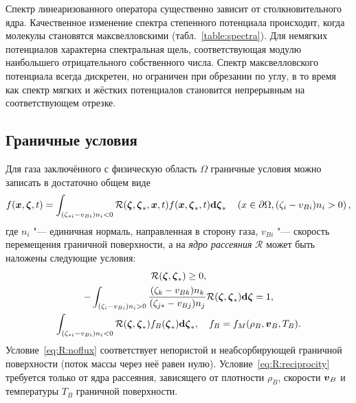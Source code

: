 Спектр линеаризованного оператора существенно зависит от столкновительного ядра.
Качественное изменение спектра степенного потенциала происходит, когда молекулы становятся максвелловскими (табл.~\ref{table:spectra}).
Для немягких потенциалов характерна спектральная щель, соответствующая модулю наибольшего отрицательного собственного числа.
Спектр максвелловского потенциала всегда дискретен, но ограничен при обрезании по углу,
в то время как спектр мягких и жёстких потенциалов становится непрерывным на соответствующем отрезке.

\subsection{Граничные условия}

Для газа заключённого с физическую область \(\Omega\) граничные условия можно записать в достаточно общем виде
\begin{equation}\label{eq:scatterring_kernel}
    f({\boldsymbol{x}},{\boldsymbol{\zeta}},t) = \int_{(\zeta_{*i}-v_{Bi})n_i<0} \mathcal{R}({\boldsymbol{\zeta}},{\boldsymbol{\zeta}}_*,{\boldsymbol{x}},t)f({\boldsymbol{x}},{\boldsymbol{\zeta}}_*,t)\boldsymbol{\mathrm{d}\zeta}_*
    \quad \left( x\in\partial\Omega, (\zeta_i-v_{Bi})n_i>0 \right),
\end{equation}
где \(n_i\) "--- единичная нормаль, направленная в сторону газа,
\(v_{Bi}\) "--- скорость перемещения граничной поверхности,
а на \emph{ядро рассеяния} \(\mathcal{R}\) может быть наложены следующие условия:
\begin{gather}
    \mathcal{R}({\boldsymbol{\zeta}},{\boldsymbol{\zeta}}_*) \geq 0, \label{eq:R:positivity}\\
    -\int_{(\zeta_i-v_{Bi})n_i>0} \frac{(\zeta_k-v_{Bk})n_k}{(\zeta_{j*}-v_{Bj})n_j} \mathcal{R}({\boldsymbol{\zeta}},{\boldsymbol{\zeta}}_*)\boldsymbol{\mathrm{d}\zeta} = 1, \label{eq:R:noflux}\\
    \int_{(\zeta_{*i}-v_{Bi})n_i<0} \mathcal{R}({\boldsymbol{\zeta}},{\boldsymbol{\zeta}}_*)f_B({\boldsymbol{\zeta}}_*)\boldsymbol{\mathrm{d}\zeta}_*, \quad f_B = f_M(\rho_B, {\boldsymbol{v}}_B, T_B). \label{eq:R:reciprocity}
\end{gather}
Условие~\eqref{eq:R:noflux} соответствует непористой и неабсорбирующей граничной поверхности
(поток массы через неё равен нулю).
Условие~\eqref{eq:R:reciprocity} требуется только от ядра рассеяния,
зависящего от плотности \(\rho_B\), скорости \({\boldsymbol{v}}_B\) и температуры \(T_B\) граничной поверхности.

